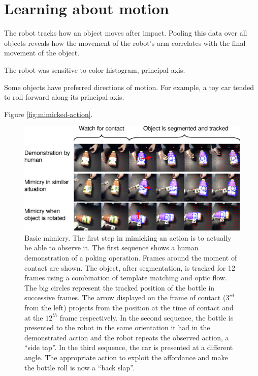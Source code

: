 
\section{Learning about motion}

The robot tracks how an object moves after impact.
Pooling this data over all objects reveals how the movement of
the robot's arm correlates with the final movement of the object.

The robot was sensitive to color histogram, principal axis.

Some objects have preferred directions of motion.  For example,
a toy car tended to roll forward along its principal axis.

Figure \ref{fig:mimicked-action}.


\ifnote
\begin{figure}[tb]
\begin{center}
\includegraphics[width=\columnwidth]{fig-mimicry-bottle}
\caption{ 
\label{fig:observed-action}
%
Basic mimicry.  The first step in mimicking an action is to actually
be able to observe it.  The first sequence shows a human demonstration
of a poking operation.  Frames around the moment of contact are shown.
The object, after segmentation, is tracked for 12 frames using a
combination of template matching and optic flow.  The big circles
represent the tracked position of the bottle in successive frames.
The arrow displayed on the frame of contact ($3^{rd}$ from the left)
projects from the position at the time of contact and at the $12^{th}$
frame respectively.
%
In the second sequence, the bottle is presented to the robot in the
same orientation it had in the demonstrated action and the robot
repeats the observed action, a ``side tap''.  In the third sequence,
the car is presented at a different angle.  The appropriate action to
exploit the affordance and make the bottle roll is now a ``back
slap''.
%
%
}
\end{center}
\end{figure}
\fi


